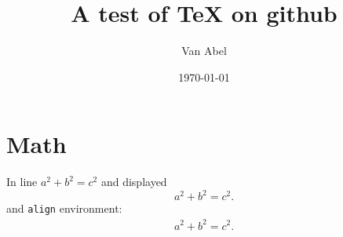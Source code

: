 \documentclass{amsart}
\begin{document}
\title{A test of TeX on github}
\author{Van Abel}
\date{\today}
\maketitle
\section{Math}
In line $a^2+b^2=c^2$ and displayed 
\[
a^2+b^2=c^2.
\]
and \texttt{align} environment:
\begin{align*}
a^2+b^2=c^2.
\end{align*}
\end{document}
